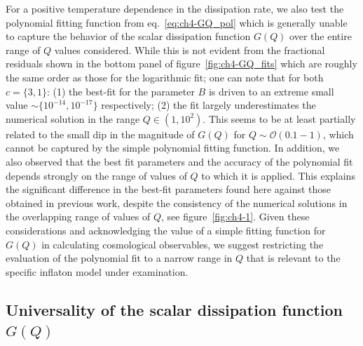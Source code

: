 For a positive temperature dependence in the dissipation rate, we also test the polynomial fitting function from eq.~\eqref{eq:ch4-GQ_pol} which is generally unable to capture the behavior of the scalar dissipation function $G(Q)$ over the entire range of $Q$ values considered. While this is not evident from the fractional residuals shown in the bottom panel of figure~\ref{fig:ch4-GQ_fits} which are roughly the same order as those for the logarithmic fit; one can note that for both $c=\{3,1\}$: (1) the best-fit for the parameter $B$ is driven to an extreme small value $\sim \{10^{-14}, 10^{-17}\}$ respectively; (2) the fit largely underestimates the numerical solution in the range $Q\in (1,10^{2})$. This seems to be at least partially related to the small dip in the magnitude of $G(Q)$ for $Q\sim \mathcal{O}(0.1-1)$, which cannot be captured by the simple polynomial fitting function. In addition, we also observed that the best fit parameters and the accuracy of the polynomial fit depends strongly on the range of values of $Q$ to which it is applied. This explains the significant difference in the best-fit parameters found here against those obtained in previous work, despite the consistency of the numerical solutions in the overlapping range of values of $Q$, see figure~\ref{fig:ch4-1}.  Given these considerations and acknowledging the value of a simple fitting function for $G(Q)$ in calculating cosmological observables, we suggest restricting the evaluation of the polynomial fit to a narrow range in $Q$ that is relevant to the specific inflaton model under examination. 

\subsection{Universality of the scalar dissipation function $G(Q)$ \label{sec:ch4-results_2}}

